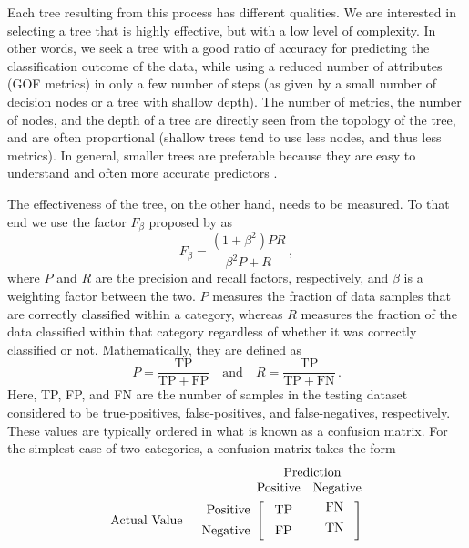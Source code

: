 Each tree resulting from this process has different qualities. We are interested in selecting a tree that is highly effective, but with a low level of complexity. In other words, we seek a tree with a good ratio of accuracy for predicting the classification outcome of the data, while using a reduced number of attributes (GOF metrics) in only a few number of steps (as given by a small number of decision nodes or a tree with shallow depth). The number of metrics, the number of nodes, and the depth of a tree are directly seen from the topology of the tree, and are often proportional (shallow trees tend to use less nodes, and thus less metrics). In general, smaller trees are preferable because they are easy to understand and often more accurate predictors \citep{Quinlan_1996_JAIR}.

The effectiveness of the tree, on the other hand, needs to be measured. To that end we use the factor $F_{\beta}$ proposed by \citet{Rijsbergen_1979_Book} as
% 
\begin{equation}
	\label{eq:f}
	F_{\beta} = \frac{ (1 + \beta^2) P R}{\beta^2 P + R}
	\, ,
\end{equation}
% 
where $P$ and $R$ are the precision and recall factors, respectively, and $\beta$ is a weighting factor between the two. $P$ measures the fraction of data samples that are correctly classified within a category, whereas $R$ measures the fraction of the data classified within that category regardless of whether it was correctly classified or not. Mathematically, they are defined as
% 
\begin{equation}
	P = \frac{ \mathrm{TP} }{ \mathrm{TP} + \mathrm{FP} } 
	\quad \mathrm{and} \quad
	R = \frac{ \mathrm{TP} }{ \mathrm{TP} + \mathrm{FN} }
	\, .
\end{equation}
% 
Here, TP, FP, and FN are the number of samples in the testing dataset considered to be true-positives, false-positives, and false-negatives, respectively. These values are typically ordered in what is known as a confusion matrix. For the simplest case of two categories, a confusion matrix takes the form
% 
\begin{equation}
\nonumber
\begin{array}{rr@{}rl}
	&					&	\multicolumn{2}{c}{\mathrm{Prediction}}		\\
	&					&	\mathrm{Positive}	&	\mathrm{Negative}	\\[0.75ex]
	\mathrm{Actual~Value}		
	&	\begin{array}{r}
			\mathrm{Positive} \\[1ex]
			\mathrm{Negative} 
		\end{array}
	&	\left[~
		\begin{array}{c}
			\mathrm{TP} \\[1ex]
			\mathrm{FP} 
		\end{array}\right.
	&
		\left.
		\begin{array}{cc}
			~\mathrm{FN} \\[1ex]
			~\mathrm{TN} \\[1ex]
		\end{array}~\right]
\end{array}
\end{equation}
